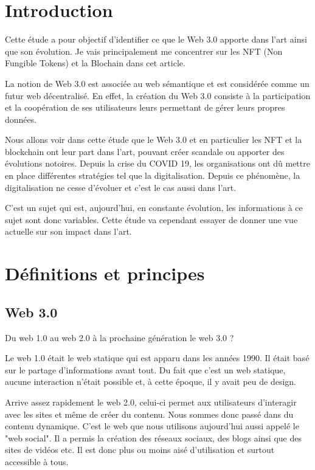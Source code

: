 \documentclass[11pt]{article}
\begin{document}
\break
\tableofcontents
\break



\section{Introduction} %
Cette étude a pour objectif d'identifier ce que le Web 3.0 apporte dans l'art ainsi que son évolution. Je vais principalement me concentrer sur les NFT (Non Fungible Tokens) et la Blochain dans cet article.

La notion de Web 3.0 est associée au web sémantique et est considérée comme un futur web décentralisé. En effet, la création du Web 3.0 consiste à la participation et la coopération de ses utilisateurs leurs permettant de gérer leurs propres données. 

Nous allons voir dans cette étude que le Web 3.0 et en particulier les NFT et la blockchain ont leur part dans l'art, pouvant créer scandale ou apporter des évolutions notoires. Depuis la crise du COVID 19, les organisations ont dû mettre en place différentes stratégies tel que la digitalisation. Depuis ce phénomène, la digitalisation ne cesse d'évoluer et c'est le cas aussi dans l'art.

C'est un sujet qui est, aujourd'hui, en constante évolution, les informations à ce sujet sont donc variables. Cette étude va cependant essayer de donner une vue actuelle sur son impact dans l'art. 
\section{Définitions et principes} %
\subsection{Web 3.0} %
Du web 1.0 au web 2.0 à la prochaine génération le web 3.0 ?

Le web 1.0 était le web statique qui est apparu dans les années 1990. Il était basé sur le partage d'informations avant tout. Du fait que c'est un web statique, aucune interaction n'était possible et, à cette époque, il y avait peu de design. 

Arrive assez rapidement le web 2.0, celui-ci permet aux utilisateurs d'interagir avec les sites et même de créer du contenu. Nous sommes donc passé dans du contenu dynamique. C'est le web que nous utilisons aujourd'hui aussi appelé le "web social". Il a permis la création des réseaux sociaux, des blogs ainsi que des sites de vidéos etc. Il est donc plus ou moins aisé d'utilisation et surtout accessible à tous. \cite{barassi_does_2012}
\end{document}
